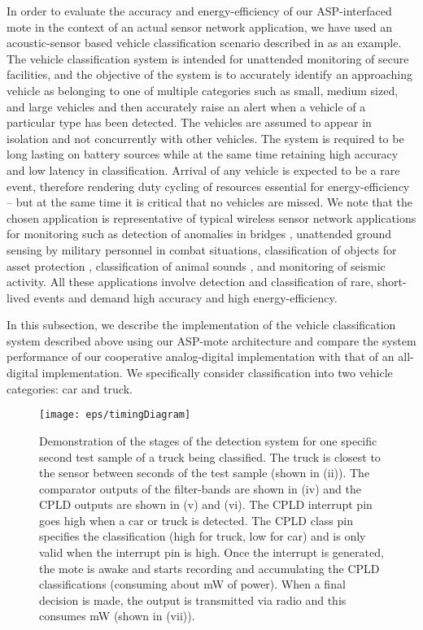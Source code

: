 In order to evaluate the accuracy and energy-efficiency of our ASP-interfaced mote in the context of an actual sensor network application, we have used an acoustic-sensor based vehicle classification scenario described in \cite{lanl} as an example. The vehicle classification system is intended for unattended monitoring of secure facilities, and the objective of the system is to accurately identify an approaching vehicle as belonging to one of multiple categories such as small, medium sized, and large vehicles and then accurately raise an alert when a vehicle of a particular type has been detected. The vehicles are assumed to appear in isolation and not concurrently with other vehicles. The system is required to be long lasting on battery sources while at the same time retaining high accuracy and low latency in classification. Arrival of any vehicle is expected to be a rare event, therefore rendering duty cycling of resources essential for energy-efficiency -- but at the same time it is critical that no vehicles are missed. We note that the chosen application is representative of typical wireless sensor network applications for monitoring such as detection of anomalies in bridges \cite{struct_rice}, unattended ground sensing by military personnel in combat situations, classification of objects for asset protection \cite{lites}, classification of animal sounds \cite{acoustic_frogs}, and monitoring of seismic activity. All these applications involve detection and classification of rare, short-lived events and demand high accuracy and high energy-efficiency. 

In this subsection, we describe the implementation of the vehicle classification system described above using our ASP-mote architecture and compare the system performance of our cooperative analog-digital implementation with that of an all-digital implementation. We specifically consider classification into two vehicle categories: car and truck.

\begin{figure}[tp]
  \begin{center}
    \texttt{[image: eps/timingDiagram]}
    \caption{Demonstration of the stages of the detection system for one specific  second test sample of a truck being classified. The truck is closest to the sensor between seconds  of the test sample (shown in (ii)). The comparator outputs of the  filter-bands are shown in (iv) and the CPLD outputs are shown in (v) and (vi). The CPLD interrupt pin goes high when a car or truck is detected. The CPLD class pin specifies the classification (high for truck, low for car) and is only valid when the interrupt pin is high.  Once the interrupt is generated, the mote is awake and starts recording and accumulating the CPLD classifications (consuming about  mW of power). When a final decision is made, the output is transmitted via radio and this consumes mW (shown in (vii)).}
    \label{truck}
  \end{center}
\end{figure}


